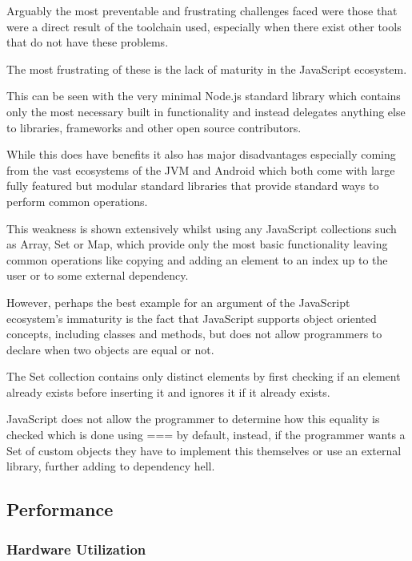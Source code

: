 \documentclass[12pt]{article}
\newcommand{\sentence}{} %
\begin{document}
    \tab
    Arguably the most preventable and frustrating challenges faced were those that were a direct result of the
    toolchain used, especially when there exist other tools that do not have these problems.
    \sentence
    The most frustrating of these is the lack of maturity in the JavaScript ecosystem.
    \sentence
    This can be seen with the very minimal Node.js standard library which contains only the most necessary built in
    functionality and instead delegates anything else to libraries, frameworks and other open source contributors.
    \sentence
    While this does have benefits it also has major disadvantages especially coming from the vast ecosystems of the
    JVM and Android which both come with large fully featured but modular standard libraries that provide standard
    ways to perform common operations.
    \sentence
    This weakness is shown extensively whilst using any JavaScript collections such as Array, Set or Map, which
    provide only the most basic functionality leaving common operations like copying and adding an element to an
    index up to the user or to some external dependency.
    \sentence
    However, perhaps the best example for an argument of the JavaScript ecosystem's immaturity is the fact that
    JavaScript supports object oriented concepts, including classes and methods, but does not allow programmers to
    declare when two objects are equal or not.
    \sentence
    The Set collection contains only distinct elements by first checking if an element already exists before
    inserting it and ignores it if it already exists.
    \sentence
    JavaScript does not allow the programmer to determine how this equality is checked which is done using === by
    default, instead, if the programmer wants a Set of custom objects they have to implement this themselves or
    use an external library, further adding to dependency hell.

    \subsection{Performance}\label{subsec:performance}


    \subsubsection{Hardware Utilization}\label{subsubsec:hardware-utilization}
\end{document}
